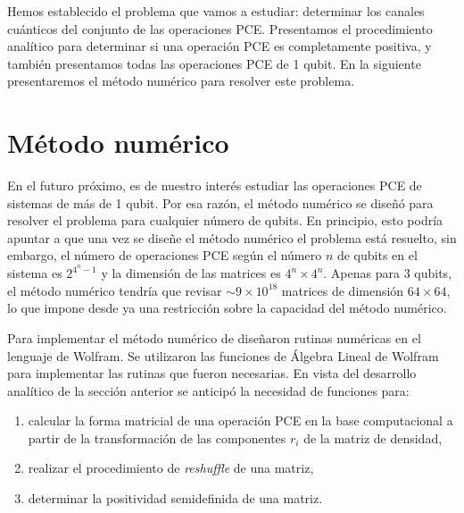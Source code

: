 Hemos establecido el problema que vamos a estudiar: determinar
los canales cuánticos del conjunto de las operaciones PCE. Presentamos
el procedimiento analítico para determinar si una operación PCE es 
completamente positiva, y también presentamos todas las operaciones
PCE de 1 qubit. En la siguiente presentaremos el método numérico para 
resolver este problema.

\section{Método numérico} %





En el futuro próximo, es de nuestro interés estudiar las 
operaciones PCE de sistemas de más de 1 qubit. Por esa 
razón, el método numérico se diseñó para resolver el 
problema para cualquier número de qubits.
En principio, esto podría apuntar a que una vez  se diseñe 
el método numérico el problema está resuelto, sin embargo, 
el número de operaciones PCE según el número $n$ de qubits
en el sistema es $2^{4^n-1}$ y la dimensión de las matrices 
es $4^n\times4^n$. Apenas para 3 qubits, el método numérico
tendría que revisar $\sim 9\times10^{18}$ matrices de 
dimensión $64\times64$, lo que impone desde ya una restricción
sobre la capacidad del método numérico. 

Para implementar el método numérico de diseñaron 
rutinas numéricas en el lenguaje de Wolfram. Se utilizaron
las funciones de Álgebra Lineal de  Wolfram para 
implementar las rutinas que fueron necesarias.
En vista del desarrollo analítico de la sección anterior
se anticipó la necesidad de funciones para:
\begin{enumerate}
\item calcular la forma matricial de una operación PCE en la
base computacional a partir de la transformación de las 
componentes $r_i$ de la matriz de densidad,
\item realizar el procedimiento de \textit{reshuffle} de una matriz,
\item determinar la positividad semidefinida de una matriz.
\end{enumerate}


